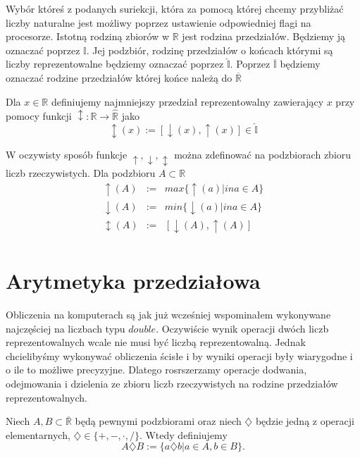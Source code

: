 Wybór któreś z podanych suriekcji, która za pomocą której chcemy przybliżać liczby naturalne jest możliwy poprzez 
ustawienie odpowiedniej flagi na procesorze.
Istotną rodziną zbiorów w $ \mathbb R $ jest rodzina przedziałów. Będziemy ją oznaczać poprzez $ \mathbb I $. 
Jej podzbiór, rodzinę przedziałów o końcach którymi są liczby reprezentowalne będziemy oznaczać poprzez $ \hat{\mathbb I } $.
Poprzez $ \overline { \mathbb I } $ będziemy oznaczać rodzine przedziałów której końce należą do $  \overline{\mathbb R} $

Dla $ x \in \mathbb R $ definiujemy najmniejszy przedział reprezentowalny zawierający $ x $ przy pomocy funkcji
$ \updownarrow : \mathbb R \to \hat{\mathbb R } $ jako
$$
    \updownarrow (x) := [\downarrow (x), \uparrow (x) ]\in \hat{\mathbb I } 
$$

W oczywisty sposób funkcje $ \uparrow, \downarrow, \updownarrow $ można zdefinować na podzbiorach zbioru liczb rzeczywistych.
Dla podzbioru $ A \subset \mathbb R $ 
\begin{eqnarray*}
    \uparrow (A) &:=& max \{ \uparrow (a) | in a \in A \} \\
    \downarrow (A) &:=& min \{ \downarrow (a) | in a \in A \} \\
    \updownarrow (A) &:=& [\downarrow(A),\uparrow(A)] \\
\end{eqnarray*}

\section{Arytmetyka przedziałowa}
Obliczenia na komputerach są jak już wcześniej wspominałem wykonywane najczęściej na liczbach typu $ double $.
Oczywiście wynik operacji dwóch liczb reprezentowalnych wcale nie musi być liczbą reprezentowalną.
Jednak chcielibyśmy wykonywać obliczenia ścisłe i by wyniki operacji były wiarygodne i o ile to możliwe precyzyjne.
Dlatego rosrszerzamy operacje dodwania, odejmowania i dzielenia ze zbioru liczb rzeczywistych na rodzine przedziałów 
reprezentowalnych.

Niech $ A,B  \subset \overline {\mathbb R } $ będą pewnymi podzbiorami oraz niech $ \diamondsuit $ będzie jedną z operacji elementarnych,
 $ \diamondsuit \in \{+,-,\cdot,/ \}.$ Wtedy definiujemy 
 \begin{equation}
    A \diamondsuit B := \{ a \diamondsuit b | a \in A , b \in B  \}.
 \end{equation}

